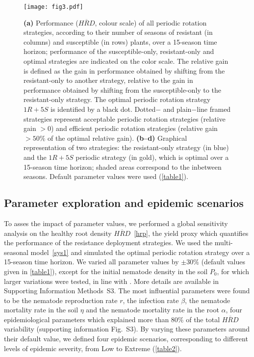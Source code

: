 {{{{\begin{figure}[ht]
  \centering
   \texttt{[image: fig3.pdf]} 
  \caption[Performance    of all periodic rotation strategies over a 15-season time horizon.]
  {\textbf{(a)} Performance ($\overline{HRD}$, colour scale)
    of all periodic rotation strategies, according to their number of
    seasons of resistant (in columns) and susceptible (in rows)
    plants, over a 15-season time horizon; performance of the
    susceptible-only, resistant-only and optimal strategies are
    indicated on the color scale.  The relative gain is defined as the
    gain in performance obtained by shifting from the resistant-only
    to another strategy, relative to the gain in performance obtained
    by shifting from the susceptible-only to the resistant-only
    strategy. The optimal periodic rotation strategy $1R+5S$ is
    identified by a black dot. Dotted$-$ and plain$-$line framed
    strategies represent acceptable periodic rotation strategies
    (relative gain $>0$) and efficient periodic rotation strategies
    (relative gain $>50\%$ of the optimal relative
    gain). \textbf{(b--d)} Graphical representation of two strategies:
    the resistant-only strategy (in blue) and the $1R+5S$
    periodic strategy (in gold), which is optimal over a
    15-season time horizon; shaded areas correspond to the inbetween
    seasons. Default parameter values were used (\autoref{table1}).  }
  \label{fig3}
\end{figure}

\subsection{Parameter exploration and epidemic scenarios}

To asses the impact of parameter values, we performed a global
sensitivity analysis \citep{Saltelli2008} on the healthy root density
$\overline{HRD}$~\eqref{hrp}, the yield proxy which quantifies the
performance of the resistance deployment strategies. We used the
multi-seasonal model~\eqref{sys1} and simulated the optimal periodic
rotation strategy over a 15-season time horizon. We varied all
parameter values by $\pm 30\%$ (default values given in
\autoref{table1}), except for the initial nematode density in the soil
$P_0$, for which larger variations were tested, in line with
\citet{Ehwaeti1998}. More details are available in Supporting
Information Methods~S3. The most influential parameters were found to
be the nematode reproduction rate $r$, the infection rate $\beta$, the
nematode mortality rate in the soil $\eta$ and the nematode mortality
rate in the root $\alpha$, four epidemiological parameters which
explained more than $80\%$ of the total $\overline{HRD}$ variability
(supporting information Fig.~S3). By varying these parameters around
their default value, we defined four epidemic scenarios, corresponding
to different levels of epidemic severity, from Low to Extreme
(\autoref{table2}).

}}}}
